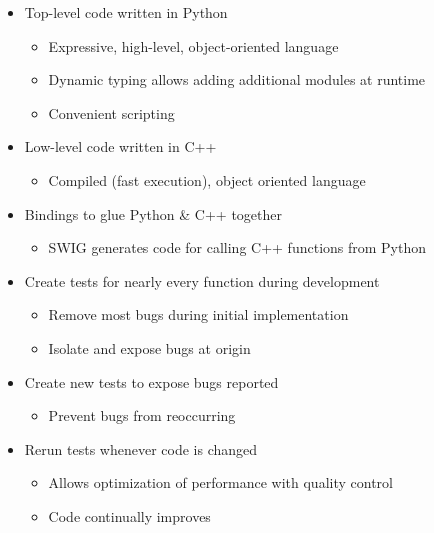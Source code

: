 \documentclass[pdftex,cig,slideColor]{pp4slides}
\begin{document}

  \begin{itemize}
  \item Top-level code written in Python
    \begin{itemize}
    \item Expressive, high-level, object-oriented language
    \item Dynamic typing allows adding additional modules at runtime
    \item Convenient scripting
    \end{itemize}
  \item Low-level code written in C++
    \begin{itemize}
    \item Compiled (fast execution), object oriented language
    \end{itemize}
  \item Bindings to glue Python \& C++ together
    \begin{itemize}
    \item SWIG generates code for calling C++ functions from Python
    \end{itemize}
  \end{itemize}

 
 \begin{itemize}
 \item Create tests for nearly every function during development
   \begin{itemize}
   \item Remove most bugs during initial implementation
   \item Isolate and expose bugs at origin
   \end{itemize}
 \item Create new tests to expose bugs reported
   \begin{itemize}
   \item Prevent bugs from reoccurring
   \end{itemize}
 \item Rerun tests whenever code is changed
   \begin{itemize}
   \item Allows optimization of performance with quality control
   \item Code continually improves
   \end{itemize}
 \end{itemize}
  
\end{document}
